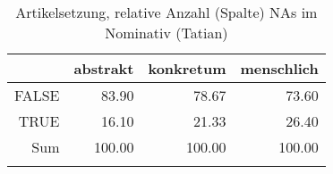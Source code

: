 \begin{table}[ht]
\centering
\begin{tabular}{rrrr}
  \lsptoprule
 & abstrakt & konkretum & menschlich \\ 
  \midrule
FALSE & 83.90 & 78.67 & 73.60 \\ 
  TRUE & 16.10 & 21.33 & 26.40 \\ 
  Sum & 100.00 & 100.00 & 100.00 \\ 
   \lspbottomrule
\end{tabular}
\caption{Artikelsetzung, relative Anzahl (Spalte) NAs im Nominativ (Tatian)} 
\end{table}
